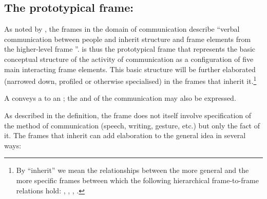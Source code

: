 \documentclass[output=paper,colorlinks,citecolor=brown]{langscibook}
\begin{document}

\subsection{The prototypical frame: }

As noted by \citet[108]{Johnson2001}, the frames in the domain of communication describe “verbal communication between people and inherit structure and frame elements from the higher-level frame ”.   is thus the prototypical frame that represents the basic conceptual structure of the activity of communication as a configuration of five main interacting frame elements. This basic structure will be further elaborated (narrowed down, profiled or otherwise specialised) in the frames that inherit it.\footnote{By “inherit” we mean the relationships between the more general and the more specific frames between which the following hierarchical frame-to-frame relations hold: , , , .} 

\begin{description}[font=\normalfont]
\item[Definition of the frame \framename{Communication}:] A  conveys a  to an ; the  and  of the communication may also be expressed. 
\end{description}

As described in the definition, the  frame does not itself involve specification of the method of communication (speech, writing, gesture, etc.) but only the fact of it. The frames that inherit  can add elaboration to the general idea in several ways: 
\end{document}
